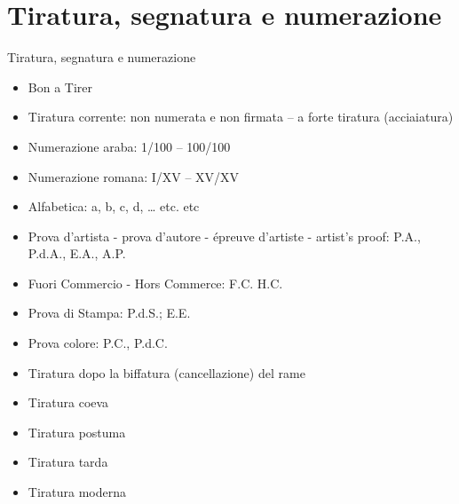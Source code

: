 \documentclass[hidelinks,aspectratio=169]{beamer}
\begin{document}
		\section{Tiratura, segnatura e numerazione}
	\begin{frame}{Tiratura, segnatura e numerazione}
		\begin{itemize}
			\item Bon a Tirer
			\item Tiratura corrente: non numerata e non firmata – a forte tiratura (acciaiatura)
			\item Numerazione araba: 1/100 – 100/100
			\item Numerazione romana: I/XV – XV/XV
			\item Alfabetica: a, b, c, d, … etc. etc
			\item Prova d’artista - prova d’autore - épreuve d’artiste - artist’s proof: P.A., P.d.A., E.A., A.P. 
			\item Fuori Commercio - Hors Commerce: F.C. H.C.
			\item Prova di Stampa: P.d.S.; E.E.
			\item Prova colore: P.C., P.d.C.
			\item Tiratura dopo la biffatura (cancellazione) del rame
		\end{itemize}
		\medskip
		\begin{itemize}
			\item Tiratura coeva
			\item Tiratura postuma
			\item Tiratura tarda
			\item Tiratura moderna
		\end{itemize}
	\end{frame}
	
\end{document}
